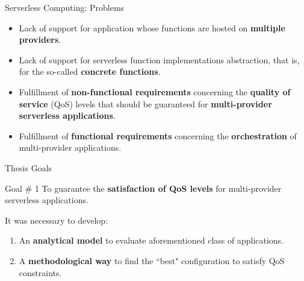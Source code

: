 \documentclass[13.5pt]{beamer}
\newcommand{\B}[1]{\textcolor{TorVergataColor}{\textbf{#1}}}
\begin{document}
\begin{frame}{Serverless Computing: Problems}
	
	\begin{itemize}
		\item Lack of support for application whose functions are hosted on \B{multiple providers}.
		\vspace{\baselineskip}
		\item Lack of support for serverless function implementations abstraction, that is, for the so-called \B{concrete functions}.
		\vspace{\baselineskip}
		\item Fulfillment of \B{non-functional requirements} concerning the \B{quality of service} (QoS) levels that should be guaranteed for \B{multi-provider serverless applications}.
		\vspace{\baselineskip}
		\item Fulfillment of \B{functional requirements} concerning the \B{orchestration} of multi-provider applications.
	\end{itemize}

\end{frame} 

\begin{frame}{Thesis Goals}
	
	\begin{block}{Goal $\#$ 1}
		\centering
	To guarantee the \B{satisfaction of QoS levels} for multi-provider serverless applications. 
	\end{block}

	\vspace{\baselineskip}
	It was necessary to develop:
	\vspace{\baselineskip} 
	
	\begin{enumerate}
		\justifying
	
	\item An \B{analytical model} to evaluate aforementioned class of applications.

	\vspace{\baselineskip} 
	
	\item A \B{methodological way} to find the ``best" configuration to satisfy QoS constraints.
	
	\end{enumerate}
	\end{frame} 

\end{document}
